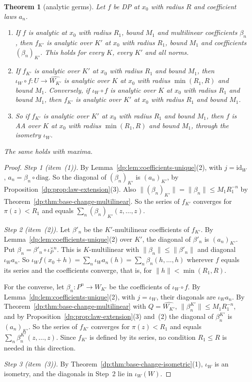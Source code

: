 \documentclass[11pt]{amsart}
\newtheorem{theorem}{Theorem}[section]
\theoremstyle{definition}
\theoremstyle{remark}
\numberwithin{equation}{section}
\newcommand{\id}{\mathrm{id}}
\newcommand{\norm}[1]{\lVert #1\rVert}
\theoremstyle{plain}
\theoremstyle{definition}
\theoremstyle{plain}
\begin{document}
\begin{theorem}[analytic germs]\label{dp:thm:an-base-change}
Let $f$ be DP at $x_0$ with radius $R$ and coefficient laws $a_n$.
\begin{enumerate}
\item If $f$ is analytic at $x_0$ with radius $R_1$, bound $M_1$ and multilinear coefficients $\beta_n$, then $f_{K'}$ is analytic over $K'$ at $x_0$ with radius $R_1$, bound $M_1$ and coefficients $(\beta_n)_{K'}$. This holds for every $K$, every $K'$ and all norms.
\item If $f_{K'}$ is analytic over $K'$ at $x_0$ with radius $R_1$ and bound $M_1$, then $\iota_W\circ f\colon U\to\widehat{W_{K'}}$ is analytic over $K$ at $x_0$ with radius $\min(R_1,R)$ and bound $M_1$. Conversely, if $\iota_W\circ f$ is analytic over $K$ at $x_0$ with radius $R_1$ and bound $M_1$, then $f_{K'}$ is analytic over $K'$ at $x_0$ with radius $R_1$ and bound $M_1$.
\item So if $f_{K'}$ is analytic over $K'$ at $x_0$ with radius $R_1$ and bound $M_1$, then $f$ is AA over $K$ at $x_0$ with radius $\min(R_1,R)$ and bound $M_1$, through the isometry $\iota_W$.
\end{enumerate}
The same holds with maxima.
\end{theorem}

\begin{proof}
\emph{Step 1 (item~(1)).} By Lemma~\ref{dp:lem:coefficients-unique}(2), with $j=\id_W$, $a_n=\beta_n\circ\mathrm{diag}$. So the diagonal of $(\beta_n)_{K'}$ is $(a_n)_{K'}$, by Proposition~\ref{dp:prop:law-extension}(3). Also $\norm{(\beta_n)_{K'}}=\norm{\beta_n}\le M_1R_1^{-n}$ by Theorem~\ref{dp:thm:base-change-multilinear}. So the series of $f_{K'}$ converges for $\pi(z)<R_1$ and equals $\sum_n(\beta_n)_{K'}(z,\dots,z)$.

\emph{Step 2 (item~(2)).} Let $\beta'_n$ be the $K'$-multilinear coefficients of $f_{K'}$. By Lemma~\ref{dp:lem:coefficients-unique}(2) over $K'$, the diagonal of $\beta'_n$ is $(a_n)_{K'}$. Put $\beta_n=\beta'_n\circ\iota_P^{\times n}$. This is $K$-multilinear with $\norm{\beta_n}\le\norm{\beta'_n}$ and diagonal $\iota_Wa_n$. So $\iota_Wf(x_0+h)=\sum_n\iota_Wa_n(h)=\sum_n\beta_n(h,\dots,h)$ wherever $f$ equals its series and the coefficients converge, that is, for $\norm h<\min(R_1,R)$.

For the converse, let $\beta_n\colon P^n\to\widehat{W_{K'}}$ be the coefficients of $\iota_W\circ f$. By Lemma~\ref{dp:lem:coefficients-unique}(2), with $j=\iota_W$, their diagonals are $\iota_Wa_n$. By Theorem~\ref{dp:thm:base-change-multilinear} with $Q=\widehat{W_{K'}}$, $\norm{\beta_n^{K'}}\le M_1R_1^{-n}$, and by Proposition~\ref{dp:prop:law-extension}(3) and~(2) the diagonal of $\beta_n^{K'}$ is $(a_n)_{K'}$. So the series of $f_{K'}$ converges for $\pi(z)<R_1$ and equals $\sum_n\beta_n^{K'}(z,\dots,z)$. Since $f_{K'}$ is defined by its series, no condition $R_1\le R$ is needed in this direction.

\emph{Step 3 (item~(3)).} By Theorem~\ref{dp:thm:base-change-isometric}(1), $\iota_W$ is an isometry, and the diagonals in Step~2 lie in $\iota_W(W)$.
\end{proof}
\end{document}
